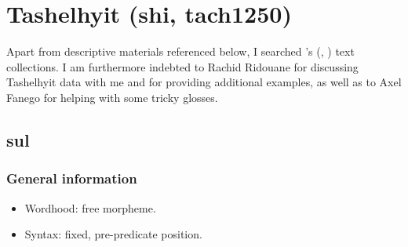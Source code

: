 \section{Tashelhyit (shi, tach1250)}
\label{appendixTashelhyit}
Apart from descriptive materials referenced below, I searched \citeauthor{Stroomer2001}'s (\citeyear{Stroomer2001}, \citeyear{Stroomer2002}) text collections. I am furthermore indebted to Rachid Ridouane for discussing Tashelhyit data with me and for providing additional examples, as well as to Axel Fanego for helping with some tricky glosses.

\subsection{sul}
\subsubsection{General information}
\begin{itemize}
	\item Wordhood: free morpheme.
	\item Syntax: fixed, pre-predicate position.
\end{itemize}


